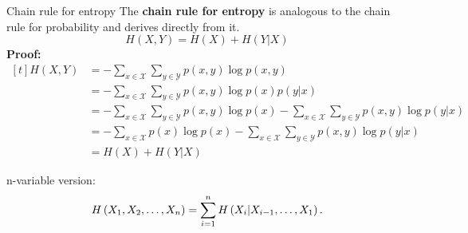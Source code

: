 \documentclass[11pt,compress,t,notes=noshow, xcolor=table]{beamer}
\begin{document}
\begin{vbframe} {Chain rule for entropy}
The \textbf{chain rule for entropy} is analogous to the chain rule for probability and derives directly from it.
$$H(X, Y)=H(X)+H(Y | X)$$
\footnotesize
\textbf{Proof:}
$\begin{aligned}[t]
H(X, Y) &=-\sum_{x \in \mathcal{X}} \sum_{y \in \mathcal{Y}} p(x, y) \log p(x, y) \\
&=-\sum_{x \in \mathcal{X}} \sum_{y \in \mathcal{Y}} p(x, y) \log p(x) p(y | x) \\
&=-\sum_{x \in \mathcal{X}} \sum_{y \in \mathcal{Y}} p(x, y) \log p(x)-\sum_{x \in \mathcal{X}} \sum_{y \in \mathcal{Y}} p(x, y) \log p(y | x) \\
&=-\sum_{x \in \mathcal{X}} p(x) \log p(x)-\sum_{x \in \mathcal{X}} \sum_{y \in \mathcal{Y}} p(x, y) \log p(y | x) \\
&=H(X)+H(Y | X)
\end{aligned}
$
\normalsize

\lz

n-variable version:
$$H\left(X_{1}, X_{2}, \ldots, X_{n}\right)=\sum\limits_{i=1}^n H\left(X_{i} | X_{i-1}, \ldots, X_{1}\right).$$





\end{vbframe}
\end{document}
